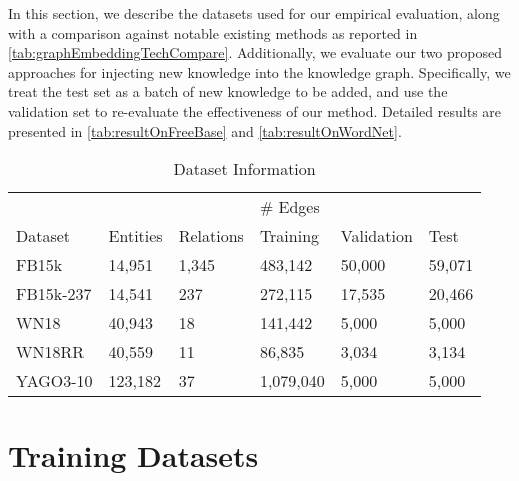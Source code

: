 In this section, we describe the datasets used for our empirical evaluation, along with a comparison against notable existing methods as reported in \autoref{tab:graphEmbeddingTechCompare}. Additionally, we evaluate our two proposed approaches for injecting new knowledge into the knowledge graph. Specifically, we treat the test set as a batch of new knowledge to be added, and use the validation set to re-evaluate the effectiveness of our method. Detailed results are presented in \autoref{tab:resultOnFreeBase} and \autoref{tab:resultOnWordNet}.


\begin{table}[H]
	\begin{center}
			\begin{tabular}{llllll}
				\hline
				&          &           & \multicolumn{3}{l}{\# Edges}    \\ \cline{4-6}
				
				Dataset   & Entities & Relations & Training & Validation & Test    \\ \hline
				FB15k     & 14,951   & 1,345     & 483,142  & 50,000     & 59,071 \\
				FB15k-237 & 14,541   & 237       & 272,115  & 17,535     & 20,466  \\
				WN18      & 40,943   & 18        & 141,442  & 5,000      & 5,000   \\
				WN18RR    & 40,559   & 11        & 86,835   & 3,034       & 3,134    \\
				YAGO3-10    & 123,182   & 37        & 1,079,040   & 5,000       & 5,000  \\
				\hline
			\end{tabular}
		\caption{Dataset Information}
		\label{tab:datasetInfo}
	\end{center}
\end{table}

\section{Training Datasets}
\label{sec:DataTraining}


